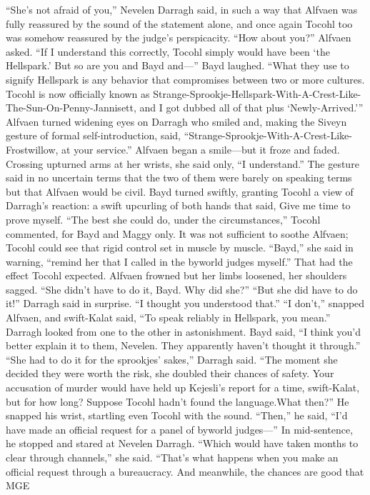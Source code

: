\documentclass[9pt]{article}
\begin{document}
“She’s not afraid of you,” Nevelen Darragh said, in such a way that Alfvaen was fully reassured by
the sound of the statement alone, and once again Tocohl too was somehow reassured by the judge’s
perspicacity.
“How about you?” Alfvaen asked. “If I understand this correctly, Tocohl simply would have been
‘the Hellspark.’ But so are you and Bayd and—”
Bayd laughed. “What they use to signify Hellspark is any behavior that compromises between two or
more
cultures.
Tocohl
is
now
officially
known
as
Strange-Sprookje-Hellspark-With-A-Crest-Like-The-Sun-On-Penny-Jannisett, and I got dubbed all of
that plus ‘Newly-Arrived.’”
Alfvaen turned widening eyes on Darragh who smiled and, making the Siveyn gesture of formal
self-introduction, said, “Strange-Sprookje-With-A-Crest-Like-Frostwillow, at your service.”
Alfvaen began a smile—but it froze and faded. Crossing upturned arms at her wrists, she said only, “I
understand.” The gesture said in no uncertain terms that the two of them were barely on speaking terms
but that Alfvaen would be civil.
Bayd turned swiftly, granting Tocohl a view of Darragh’s reaction: a swift upcurling of both hands
that said, Give me time to prove myself.
“The best she could do, under the circumstances,” Tocohl commented, for Bayd and Maggy only. It
was not sufficient to soothe Alfvaen; Tocohl could see that rigid control set in muscle by muscle. “Bayd,”
she said in warning, “remind her that I called in the byworld judges myself.”
That had the effect Tocohl expected. Alfvaen frowned but her limbs loosened, her shoulders sagged.
“She didn’t have to do it, Bayd. Why did she?”
“But she did have to do it!” Darragh said in surprise. “I thought you understood that.”
“I don’t,” snapped Alfvaen, and swift-Kalat said, “To speak reliably in Hellspark, you mean.”
Darragh looked from one to the other in astonishment. Bayd said, “I think you’d better explain it to
them, Nevelen. They apparently haven’t thought it through.”
“She had to do it for the sprookjes’ sakes,” Darragh said. “The moment she decided they were
worth the risk, she doubled their chances of safety. Your accusation of murder would have held up
Kejesli’s report for a time, swift-Kalat, but for how long? Suppose Tocohl hadn’t found the language.What then?”
He snapped his wrist, startling even Tocohl with the sound. “Then,” he said, “I’d have made an
official request for a panel of byworld judges—” In mid-sentence, he stopped and stared at Nevelen
Darragh.
“Which would have taken months to clear through channels,” she said. “That’s what happens when
you make an official request through a bureaucracy. And meanwhile, the chances are good that MGE
\end{document}
